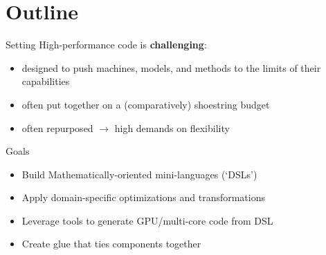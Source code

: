 \documentclass[english,compress]{beamer}
\begin{document}
\section{Outline}
\begin{frame}{Setting}
  High-performance code is \textbf{challenging}:
  \begin{itemize}
    \item designed to push machines, models, and methods to the limits
      of their capabilities

    \item often put together on a (comparatively) shoestring budget

    \item often repurposed $\rightarrow$ high demands on
    flexibility
  \end{itemize}

\end{frame}
\begin{frame}{Goals}
  \begin{itemize}
    \item Build Mathematically-oriented mini-languages (`DSLs')
    \item Apply domain-specific optimizations and transformations
    \item Leverage tools to generate GPU/multi-core code from DSL
    \item Create glue that ties components together
  \end{itemize}
  \uncover<+->{}
\end{frame}
\end{document}
